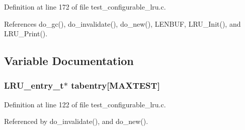 Definition at line 172 of file test\_\-configurable\_\-lru.c.

References do\_\-gc(), do\_\-invalidate(), do\_\-new(), LENBUF, LRU\_\-Init(), and LRU\_\-Print().

\subsection{Variable Documentation}
\subsubsection{\setlength{\rightskip}{0pt plus 5cm}LRU\_\-entry\_\-t$\ast$ {\bf tabentry}[MAXTEST]}\label{test__configurable__lru_8c_a4}




Definition at line 122 of file test\_\-configurable\_\-lru.c.

Referenced by do\_\-invalidate(), and do\_\-new().